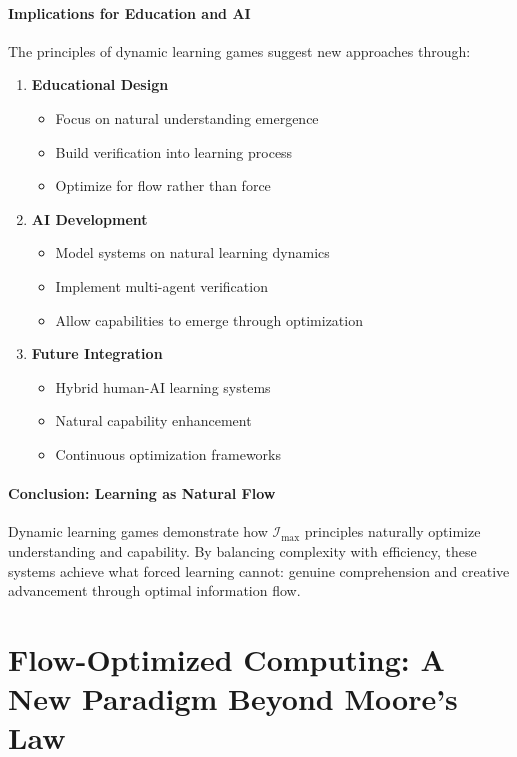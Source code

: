 \documentclass[12pt]{article}
\begin{document}
\paragraph{Implications for Education and AI}
The principles of dynamic learning games suggest new approaches through:
\begin{enumerate}
    \item \textbf{Educational Design}
    \begin{itemize}
        \item Focus on natural understanding emergence
        \item Build verification into learning process
        \item Optimize for flow rather than force
    \end{itemize}
    
    \item \textbf{AI Development}
    \begin{itemize}
        \item Model systems on natural learning dynamics
        \item Implement multi-agent verification
        \item Allow capabilities to emerge through optimization
    \end{itemize}
    
    \item \textbf{Future Integration}
    \begin{itemize}
        \item Hybrid human-AI learning systems
        \item Natural capability enhancement
        \item Continuous optimization frameworks
    \end{itemize}
\end{enumerate}

\paragraph{Conclusion: Learning as Natural Flow}
Dynamic learning games demonstrate how \(\mathcal{I}_{\text{max}}\) principles naturally optimize understanding and capability. By balancing complexity with efficiency, these systems achieve what forced learning cannot: genuine comprehension and creative advancement through optimal information flow.


\section{Flow-Optimized Computing: A New Paradigm Beyond Moore’s Law}
\end{document}

